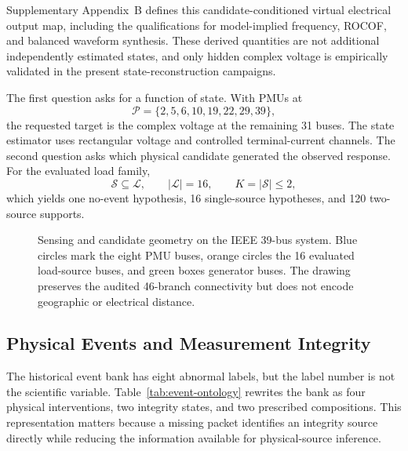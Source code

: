 Supplementary Appendix~B defines this candidate-conditioned virtual electrical
output map, including the qualifications for model-implied frequency, ROCOF,
and balanced waveform synthesis. These derived quantities are not additional
independently estimated states, and only hidden complex voltage is empirically
validated in the present state-reconstruction campaigns.

The first question asks for a function of state. With PMUs at
\begin{equation}
 \mathcal P=\{2,5,6,10,19,22,29,39\},
 \label{eq:pmu-set}
\end{equation}
the requested target is the complex voltage at the remaining 31 buses. The state estimator uses rectangular voltage and controlled terminal-current channels. The second question asks which physical candidate generated the observed response. For the evaluated load family,
\begin{equation}
 \mathcal S\subseteq\mathcal L,\qquad |\mathcal L|=16,\qquad
 K=|\mathcal S|\le2,
 \label{eq:sparse-load-support}
\end{equation}
which yields one no-event hypothesis, 16 single-source hypotheses, and 120 two-source supports.

\begin{figure}[t]
\centering
\resizebox{\textwidth}{!}{}
\caption{Sensing and candidate geometry on the IEEE 39-bus system. Blue circles mark the eight PMU buses, orange circles the 16 evaluated load-source buses, and green boxes generator buses. The drawing preserves the audited 46-branch connectivity but does not encode geographic or electrical distance.}
\label{fig:ieee39-topology}
\end{figure}

\subsection{Physical Events and Measurement Integrity}

The historical event bank has eight abnormal labels, but the label number is not the scientific variable. Table~\ref{tab:event-ontology} rewrites the bank as four physical interventions, two integrity states, and two prescribed compositions. This representation matters because a missing packet identifies an integrity source directly while reducing the information available for physical-source inference.

